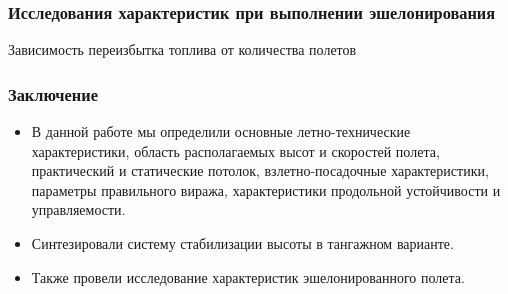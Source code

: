 \documentclass{beamer}
\begin{document}
\begin{frame}[t]
    \frametitle{Исследования характеристик при выполнении эшелонирования}
    \begin{center}
        Зависимость переизбытка топлива от количества полетов 
        \resizebox{0.7\textwidth}{!}{}
    \end{center}
\end{frame}

\begin{frame}[t]
    \frametitle{Заключение}
    \begin{itemize}
        \item В данной работе мы определили основные летно-технические характеристики,
            область располагаемых высот и скоростей полета, практический и статические
            потолок, взлетно-посадочные характеристики, параметры правильного виража, 
            характеристики продольной устойчивости и управляемости.
        \item Синтезировали систему стабилизации высоты в тангажном варианте.
        \item Также провели исследование характеристик эшелонированного полета.  
    \end{itemize}
\end{frame}
\end{document}
